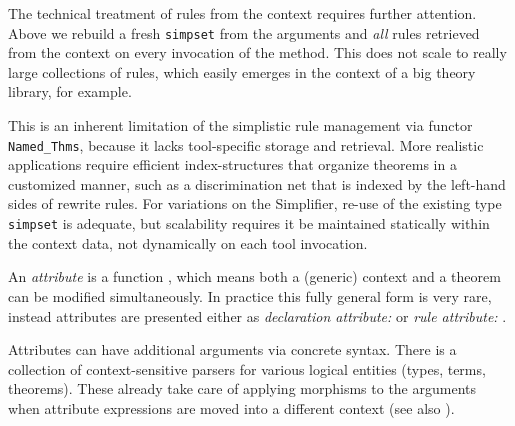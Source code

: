 \begin{isabellebody}
\begin{isamarkuptext}
  \medskip The technical treatment of rules from the context requires
  further attention.  Above we rebuild a fresh \verb|simpset| from
  the arguments and \emph{all} rules retrieved from the context on
  every invocation of the method.  This does not scale to really large
  collections of rules, which easily emerges in the context of a big
  theory library, for example.

  This is an inherent limitation of the simplistic rule management via
  functor \verb|Named_Thms|, because it lacks tool-specific
  storage and retrieval.  More realistic applications require
  efficient index-structures that organize theorems in a customized
  manner, such as a discrimination net that is indexed by the
  left-hand sides of rewrite rules.  For variations on the Simplifier,
  re-use of the existing type \verb|simpset| is adequate, but
  scalability requires it be maintained statically within the context
  data, not dynamically on each tool invocation.%
\end{isamarkuptext}%
\isamarkuptrue%
%
\isamarkuptrue%
%
\begin{isamarkuptext}%
An \emph{attribute} is a function , which means both a (generic) context and a theorem
  can be modified simultaneously.  In practice this fully general form
  is very rare, instead attributes are presented either as
  \emph{declaration attribute:}  or
  \emph{rule attribute:} .

  Attributes can have additional arguments via concrete syntax.  There
  is a collection of context-sensitive parsers for various logical
  entities (types, terms, theorems).  These already take care of
  applying morphisms to the arguments when attribute expressions are
  moved into a different context (see also ).


\end{isamarkuptext}
\end{isabellebody}
